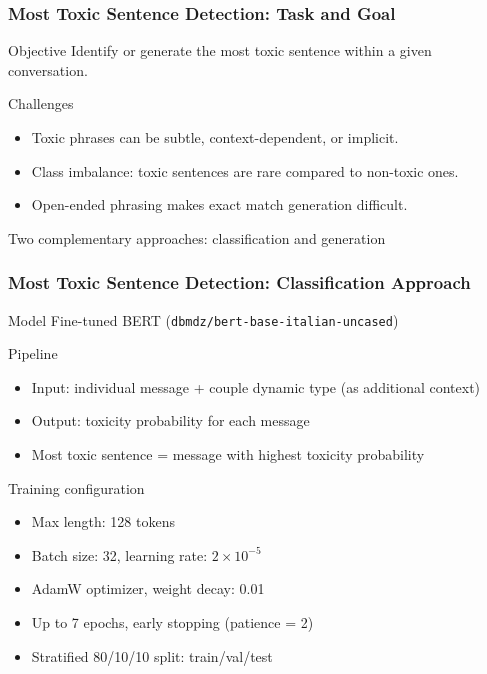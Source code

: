 \documentclass{beamer}
\begin{document}
\begin{frame}
\frametitle{Most Toxic Sentence Detection: Task and Goal}

\begin{block}{Objective}
Identify or generate the most toxic sentence within a given conversation.
\end{block}

\begin{block}{Challenges}
\begin{itemize}
\item Toxic phrases can be subtle, context-dependent, or implicit.
\item Class imbalance: toxic sentences are rare compared to non-toxic ones.
\item Open-ended phrasing makes exact match generation difficult.
\end{itemize}
\end{block}

\vspace{0.3cm}
\begin{center}
\colorbox{yellow!10}{\parbox{0.8\linewidth}{\centering Two complementary approaches: classification and generation}}
\end{center}

\end{frame}

\begin{frame}
\frametitle{Most Toxic Sentence Detection: Classification Approach}

\begin{block}{Model}
Fine-tuned BERT (\texttt{dbmdz/bert-base-italian-uncased})
\end{block}

\begin{block}{Pipeline}
\begin{itemize}
\item Input: individual message + couple dynamic type (as additional context)
\item Output: toxicity probability for each message
\item Most toxic sentence = message with highest toxicity probability
\end{itemize}
\end{block}

\begin{exampleblock}{Training configuration}
\begin{itemize}
\item Max length: 128 tokens
\item Batch size: 32, learning rate: $2 \times 10^{-5}$
\item AdamW optimizer, weight decay: 0.01
\item Up to 7 epochs, early stopping (patience = 2)
\item Stratified 80/10/10 split: train/val/test
\end{itemize}
\end{exampleblock}

\end{frame}
\end{document}
